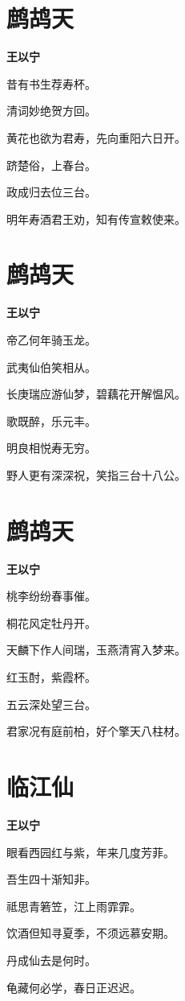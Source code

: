 \documentclass[12pt,a4paper]{ctexbook}
\begin{document}
\section{鹧鸪天}
\textbf{王以宁}\par\vspace{0.5em}
昔有书生荐寿杯。\par
清词妙绝贺方回。\par
黄花也欲为君寿，先向重阳六日开。\par
跻楚俗，上春台。\par
政成归去位三台。\par
明年寿酒君王劝，知有传宣敕使来。\par

\section{鹧鸪天}
\textbf{王以宁}\par\vspace{0.5em}
帝乙何年骑玉龙。\par
武夷仙伯笑相从。\par
长庚瑞应游仙梦，碧藕花开解愠风。\par
歌既醉，乐元丰。\par
明良相悦寿无穷。\par
野人更有深深祝，笑指三台十八公。\par

\section{鹧鸪天}
\textbf{王以宁}\par\vspace{0.5em}
桃李纷纷春事催。\par
桐花风定牡丹开。\par
天麟下作人间瑞，玉燕清宵入梦来。\par
红玉酎，紫霞杯。\par
五云深处望三台。\par
君家况有庭前柏，好个擎天八柱材。\par

\section{临江仙}
\textbf{王以宁}\par\vspace{0.5em}
眼看西园红与紫，年来几度芳菲。\par
吾生四十渐知非。\par
祗思青箬笠，江上雨霏霏。\par
饮酒但知寻夏季，不须远慕安期。\par
丹成仙去是何时。\par
龟藏何必学，春日正迟迟。\par
\end{document}
